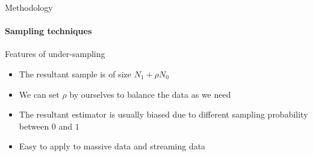 \documentclass{beamer}
\newcommand{\red}{\color{red}}
\begin{document}
    \begin{frame}{Methodology}
    \framesubtitle{Sampling techniques}
    \begin{block}{Features of under-sampling}
        \begin{itemize}
        \item The resultant sample is of size $N_1+\rho N_0$
        \item We can set $\rho$ by ourselves to balance the data as we need
        \item The resultant estimator is usually {\red biased} due to different sampling probability between $0$ and $1$ 
        \item Easy to apply to massive data and streaming data
    \end{itemize}
    \end{block}    
    \end{frame}
\end{document}
